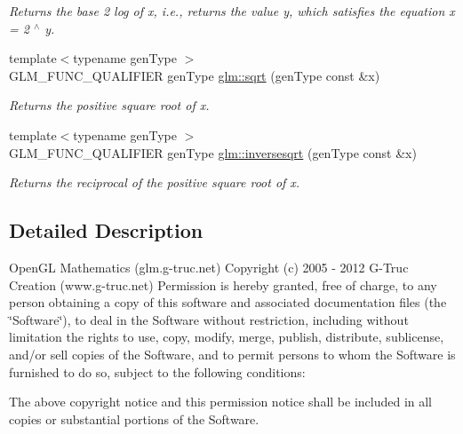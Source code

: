\begin{DoxyCompactItemize}
\begin{DoxyCompactList}\small\item\em Returns the base 2 log of x, i.\-e., returns the value y, which satisfies the equation x = 2 $^\wedge$ y. \end{DoxyCompactList}\item 
{\footnotesize template$<$typename gen\-Type $>$ }\\G\-L\-M\-\_\-\-F\-U\-N\-C\-\_\-\-Q\-U\-A\-L\-I\-F\-I\-E\-R gen\-Type \hyperlink{group__core__func__exponential_ga9b2fd4f39c29e3d55c4b4087ab873f9f}{glm\-::sqrt} (gen\-Type const \&x)
\begin{DoxyCompactList}\small\item\em Returns the positive square root of x. \end{DoxyCompactList}\item 
{\footnotesize template$<$typename gen\-Type $>$ }\\G\-L\-M\-\_\-\-F\-U\-N\-C\-\_\-\-Q\-U\-A\-L\-I\-F\-I\-E\-R gen\-Type \hyperlink{group__core__func__exponential_ga3fd19e045e3943b96e0cdad22fbda111}{glm\-::inversesqrt} (gen\-Type const \&x)
\begin{DoxyCompactList}\small\item\em Returns the reciprocal of the positive square root of x. \end{DoxyCompactList}\end{DoxyCompactItemize}


\subsection{Detailed Description}
Open\-G\-L Mathematics (glm.\-g-\/truc.\-net) Copyright (c) 2005 -\/ 2012 G-\/\-Truc Creation (www.\-g-\/truc.\-net) Permission is hereby granted, free of charge, to any person obtaining a copy of this software and associated documentation files (the \char`\"{}\-Software\char`\"{}), to deal in the Software without restriction, including without limitation the rights to use, copy, modify, merge, publish, distribute, sublicense, and/or sell copies of the Software, and to permit persons to whom the Software is furnished to do so, subject to the following conditions\-:

The above copyright notice and this permission notice shall be included in all copies or substantial portions of the Software.

